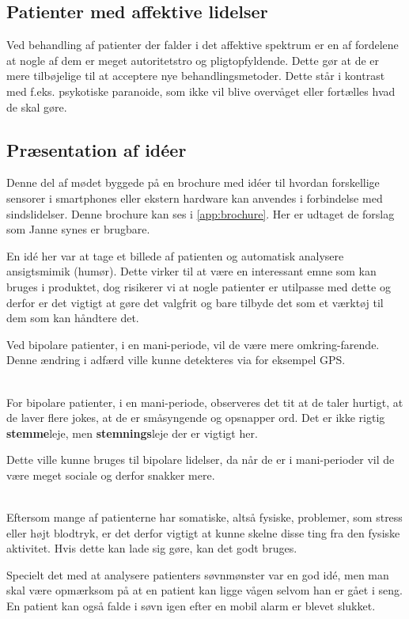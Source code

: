 \subsection{Patienter med affektive lidelser}
Ved behandling af patienter der falder i det affektive spektrum er en af fordelene at nogle af dem er meget autoritetstro og pligtopfyldende.
Dette gør at de er mere tilbøjelige til at acceptere nye behandlingsmetoder.
Dette står i kontrast med f.eks. psykotiske paranoide, som ikke vil blive overvåget eller fortælles hvad de skal gøre.

\subsection{Præsentation af idéer}\label{janne_ideer}
Denne del af mødet byggede på en brochure med idéer til hvordan forskellige sensorer i smartphones eller ekstern hardware kan anvendes i forbindelse med sindslidelser. 
Denne brochure kan ses i \cref{app:brochure}.
Her er udtaget de forslag som Janne synes er brugbare.

\begin{description}[style=nextline]
\item[Billedanalyse]
En idé her var at tage et billede af patienten og automatisk analysere ansigtsmimik (humør).
Dette virker til at være en interessant emne som kan bruges i produktet, dog risikerer vi at nogle patienter er utilpasse med dette og derfor er det vigtigt at gøre det valgfrit og bare tilbyde det som et værktøj til dem som kan håndtere det.


\item[Placering]
Ved bipolare patienter, i en mani-periode, vil de være mere omkring-farende.
Denne ændring i adfærd ville kunne detekteres via for eksempel GPS.

\item[Lyd] \hfill \\
For bipolare patienter, i en mani-periode, observeres det tit at de taler hurtigt, at de laver flere jokes, at de er småsyngende og opsnapper ord. Det er ikke rigtig \textbf{stemme}leje, men \textbf{stemnings}leje der er vigtigt her.

\item[Opkald]
Dette ville kunne bruges til bipolare lidelser, da når de er i mani-perioder vil de være meget sociale og derfor snakker mere. 

\item[Puls] \hfill \\
Eftersom mange af patienterne har somatiske, altså fysiske, problemer, som stress eller højt blodtryk, er det derfor vigtigt at kunne skelne disse ting fra den fysiske aktivitet.
Hvis dette kan lade sig gøre, kan det godt bruges.

\item[Søvn]
Specielt det med at analysere patienters søvnmønster var en god idé, men man skal være opmærksom på at en patient kan ligge vågen selvom han er gået i seng. 
En patient kan også falde i søvn igen efter en mobil alarm er blevet slukket.
\end{description}

